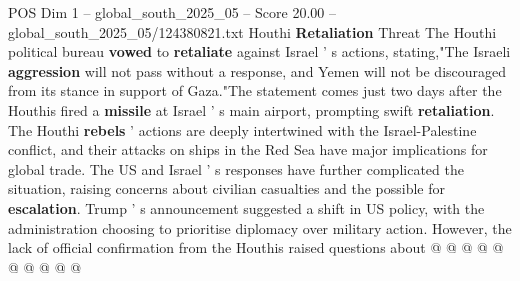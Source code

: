\begin{textsample}{POS Dim 1 – global\_south\_2025\_05 – Score 20.00 – global\_south\_2025\_05/124380821.txt}
Houthi \textbf{Retaliation} Threat The Houthi political bureau \textbf{vowed} to \textbf{retaliate} against Israel ' s actions, stating,"The Israeli \textbf{aggression} will not pass without a response, and Yemen will not be discouraged from its stance in support of Gaza."The statement comes just two days after the Houthis fired a \textbf{missile} at Israel ' s main airport, prompting swift \textbf{retaliation}.
The Houthi \textbf{rebels} ' actions are deeply intertwined with the Israel-Palestine conflict, and their attacks on ships in the Red Sea have major implications for global trade.
The US and Israel ' s responses have further complicated the situation, raising concerns about civilian casualties and the possible for \textbf{escalation}.
Trump ' s announcement suggested a shift in US policy, with the administration choosing to prioritise diplomacy over military action.
However, the lack of official confirmation from the Houthis raised questions about @ @ @ @ @ @ @ @ @ @

\end{textsample}
